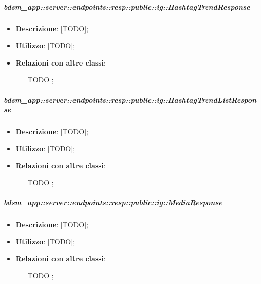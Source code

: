     \subparagraph{bdsm\_app::server::endpoints::resp::public::ig::HashtagTrendResponse} %
    \label{subp:bdsm_app_server_endpoints_resp_public_ig_hashtagtrendresponse}
    \begin{itemize}
      \item \textbf{Descrizione}: [TODO];
      \item \textbf{Utilizzo}: [TODO];
      \item \textbf{Relazioni con altre classi}:
        \begin{itemize}
          \item [TODO];
        \end{itemize}
      \end{itemize}
    
    \subparagraph{bdsm\_app::server::endpoints::resp::public::ig::HashtagTrendListResponse} %
    \label{subp:bdsm_app_server_endpoints_resp_public_ig_hashtagtrendlistresponse}
    \begin{itemize}
      \item \textbf{Descrizione}: [TODO];
      \item \textbf{Utilizzo}: [TODO];
      \item \textbf{Relazioni con altre classi}:
        \begin{itemize}
          \item [TODO];
        \end{itemize}
      \end{itemize}
    
    \subparagraph{bdsm\_app::server::endpoints::resp::public::ig::MediaResponse} %
    \label{subp:bdsm_app_server_endpoints_resp_public_ig_mediaresponse}
    \begin{itemize}
      \item \textbf{Descrizione}: [TODO];
      \item \textbf{Utilizzo}: [TODO];
      \item \textbf{Relazioni con altre classi}:
        \begin{itemize}
          \item [TODO];
        \end{itemize}
      \end{itemize}
    
